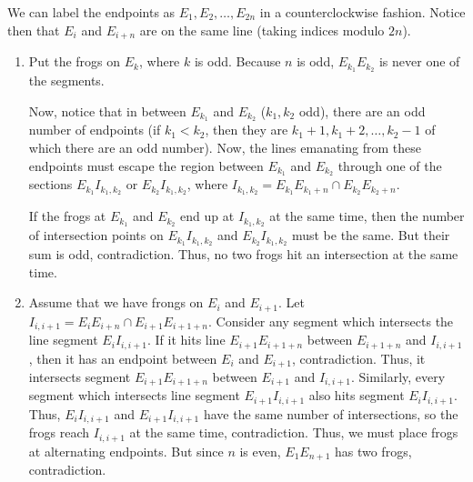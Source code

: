 We can label the endpoints as $E_1,E_2,\ldots,E_{2n}$ in a counterclockwise fashion. Notice then that $E_i$ and $E_{i+n}$ are on the same line (taking indices modulo $2n$).
\begin{enumerate}[label=(\alph*)]
	\item Put the frogs on $E_k$, where $k$ is odd. Because $n$ is odd, $E_{k_1}E_{k_2}$ is never one of the segments.
	
	Now, notice that in between $E_{k_1}$ and $E_{k_2}$ ($k_1,k_2$ odd), there are an odd number of endpoints (if $k_1<k_2$, then they are $k_1+1,k_1+2,\ldots,k_2-1$ of which there are an odd number). Now, the lines emanating from these endpoints must escape the region between $E_{k_1}$ and $E_{k_2}$ through one of the sections $E_{k_1}I_{k_1,k_2}$ or $E_{k_2}I_{k_1,k_2}$, where $I_{k_1,k_2}=E_{k_1}E_{k_1+n}\cap E_{k_2}E_{k_2+n}$.
	
	If the frogs at $E_{k_1}$ and $E_{k_2}$ end up at $I_{k_1,k_2}$ at the same time, then the number of intersection points on $E_{k_1}I_{k_1,k_2}$ and $E_{k_2}I_{k_1,k_2}$ must be the same. But their sum is odd, contradiction. Thus, no two frogs hit an intersection at the same time.
	\item Assume that we have frongs on $E_i$ and $E_{i+1}$. Let $I_{i,i+1}=E_iE_{i+n}\cap E_{i+1}E_{i+1+n}$. Consider any segment which intersects the line segment $E_iI_{i,i+1}$. If it hits line $E_{i+1}E_{i+1+n}$ between $E_{i+1+n}$ and $I_{i,i+1}$, then it has an endpoint between $E_i$ and $E_{i+1}$, contradiction. Thus, it intersects segment $E_{i+1}E_{i+1+n}$ between $E_{i+1}$ and $I_{i,i+1}$. Similarly, every segment which intersects line segment $E_{i+1}I_{i,i+1}$ also hits segment $E_iI_{i,i+1}$. Thus, $E_iI_{i,i+1}$ and $E_{i+1}I_{i,i+1}$ have the same number of intersections, so the frogs reach $I_{i,i+1}$ at the same time, contradiction. Thus, we must place frogs at alternating endpoints. But since $n$ is even, $E_1E_{n+1}$ has two frogs, contradiction.
\end{enumerate}